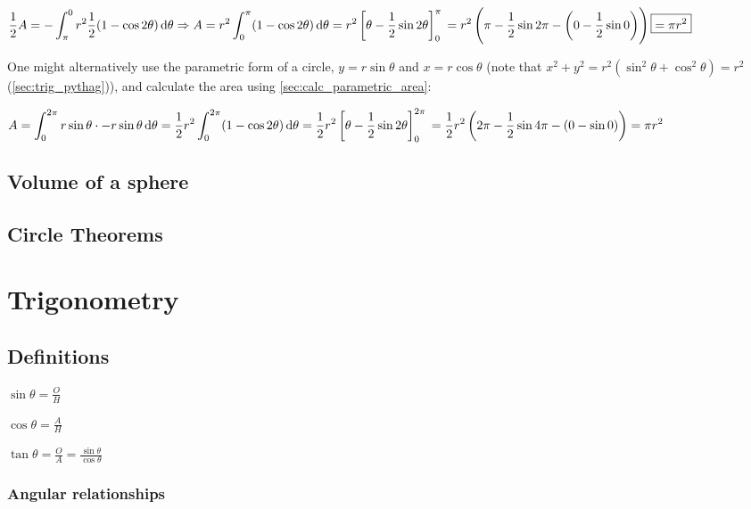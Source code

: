 \documentclass[a4paper,11pt]{article}
\begin{document}
    $\displaystyle \frac 12 A = -\int_\pi^0
        r^2 \frac 12 (1 - \cos 2 \theta) \dif \theta \Rightarrow
     A = r^2 \int_0^\pi (1 - \cos 2 \theta) \dif \theta =
     r^2\left[\theta - \frac 12 \sin 2 \theta \right]_0^\pi
     \\= r^2 \left(\pi - \frac 12 \sin 2 \pi -
                   \left(0 - \frac 12 \sin 0\right)\right) \boxed{= \pi r^2}$

    One might alternatively use the parametric form of a circle,
    $y = r \sin \theta$ and $x = r \cos \theta$
    (note that $x^2 + y^2 = r^2(\sin^2 \theta + \cos^2 \theta) = r^2$
    (\ref{sec:trig_pythag})), and calculate the area using
    \ref{sec:calc_parametric_area}:

    $\displaystyle A = \int_0^{2\pi}
        r \sin \theta \cdot -r \sin \theta \dif \theta =
     \frac 12 r^2 \int_0^{2\pi} (1 - \cos 2 \theta) \dif \theta =
     \frac 12 r^2 \left[\theta - \frac 12 \sin 2 \theta\right]_0^{2\pi}
     \\= \frac 12 r^2 \left(2\pi - \frac 12 \sin 4 \pi -
                      \left(0 - \sin 0\right)\right) = \pi r^2$

    \subsection{Volume of a sphere}

    \subsection{Circle Theorems}

    \section{Trigonometry}

    \subsection{Definitions} \label{sec:trig_definitions}


    $\displaystyle\sin \theta = \frac OH$

    $\displaystyle\cos \theta = \frac AH$

    $\displaystyle\tan \theta = \frac OA = \frac{\sin \theta}{\cos \theta}$

    \subsubsection{Angular relationships} \label{sec:trig_periodic}
\end{document}
